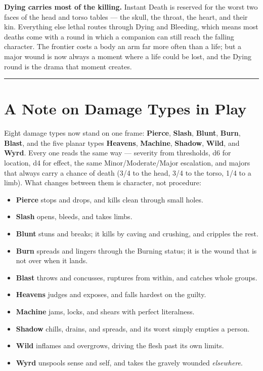 \textbf{Dying carries most of the killing.} Instant Death is reserved for the worst two faces of the head and torso tables --- the skull, the throat, the heart, and their kin. Everything else lethal routes through Dying and Bleeding, which means most deaths come with a round in which a companion can still reach the falling character. The frontier costs a body an arm far more often than a life; but a major wound is now always a moment where a life could be lost, and the Dying round is the drama that moment creates.

\medskip\hrule\medskip

\section{A Note on Damage Types in Play}

Eight damage types now stand on one frame: \textbf{Pierce}, \textbf{Slash}, \textbf{Blunt}, \textbf{Burn}, \textbf{Blast}, and the five planar types \textbf{Heavens}, \textbf{Machine}, \textbf{Shadow}, \textbf{Wild}, and \textbf{Wyrd}. Every one reads the same way --- severity from thresholds, d6 for location, d4 for effect, the same Minor/Moderate/Major escalation, and majors that always carry a chance of death (3/4 to the head, 3/4 to the torso, 1/4 to a limb). What changes between them is character, not procedure:

\begin{itemize}
    \item \textbf{Pierce} stops and drops, and kills clean through small holes.
    \item \textbf{Slash} opens, bleeds, and takes limbs.
    \item \textbf{Blunt} stuns and breaks; it kills by caving and crushing, and cripples the rest.
    \item \textbf{Burn} spreads and lingers through the Burning status; it is the wound that is not over when it lands.
    \item \textbf{Blast} throws and concusses, ruptures from within, and catches whole groups.
    \item \textbf{Heavens} judges and exposes, and falls hardest on the guilty.
    \item \textbf{Machine} jams, locks, and shears with perfect literalness.
    \item \textbf{Shadow} chills, drains, and spreads, and its worst simply empties a person.
    \item \textbf{Wild} inflames and overgrows, driving the flesh past its own limits.
    \item \textbf{Wyrd} unspools sense and self, and takes the gravely wounded \textit{elsewhere}.
\end{itemize}

